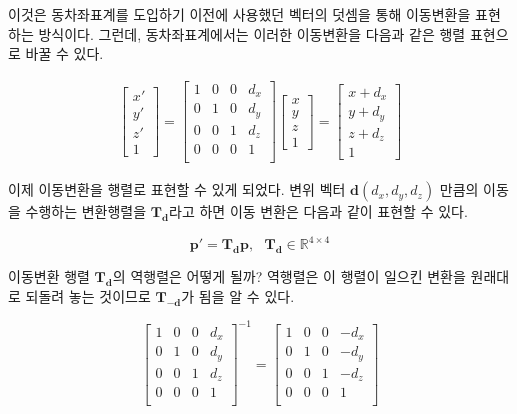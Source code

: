 이것은 동차좌표계를 도입하기 이전에 사용했던 벡터의 덧셈을 통해 이동변환을 표현하는 방식이다.
그런데, 동차좌표계에서는 이러한 이동변환을 다음과 같은 행렬 표현으로 바꿀 수 있다.


\begin{eqnarray}
\left [
\begin{array}{c}
x' \\y' \\ z' \\ 1
\end{array}
\right ]
=
\left [
\begin{array}{cccc}
1 & 0 & 0 & d_x \\
0 & 1 & 0 & d_y \\
0 & 0 & 1 & d_z \\
0 & 0 & 0 & 1 \\
\end{array}
\right ]
\left [
\begin{array}{c}
x \\ y \\ z \\ 1
\end{array}
\right ]
=
\left [
\begin{array}{c}
x+d_x \\ y+d_y \\ z+d_z \\ 1
\end{array}
\right ]
\end{eqnarray}

이제 이동변환을 행렬로 표현할 수 있게 되었다. 변위 벡터 $\mathbf d(d_x,d_y,d_z)$ 만큼의 이동을 수행하는 변환행렬을 $\mathbf T_{\mathbf d}$라고 하면
이동 변환은 다음과 같이 표현할 수 있다.

$$\mathbf p' = \mathbf T_{\mathbf d} \mathbf p, ~~~\mathbf T_{\mathbf d} \in \mathbb R^{4 \times 4}$$

이동변환 행렬 $\mathbf T_{\mathbf d}$의 역행렬은 어떻게 될까? 역행렬은 이 행렬이 일으킨 변환을 원래대로 되돌려 놓는 것이므로 
$\mathbf T_{- \mathbf d}$가 됨을 알 수 있다.

$$
\left [
\begin{array}{cccc}
1 & 0 & 0 & d_x \\
0 & 1 & 0 & d_y \\
0 & 0 & 1 & d_z \\
0 & 0 & 0 & 1 \\
\end{array}
\right ]^{-1}
= 
\left [
\begin{array}{cccc}
1 & 0 & 0 & -d_x \\
0 & 1 & 0 & -d_y \\
0 & 0 & 1 & -d_z \\
0 & 0 & 0 & 1 \\
\end{array}
\right ]
$$


